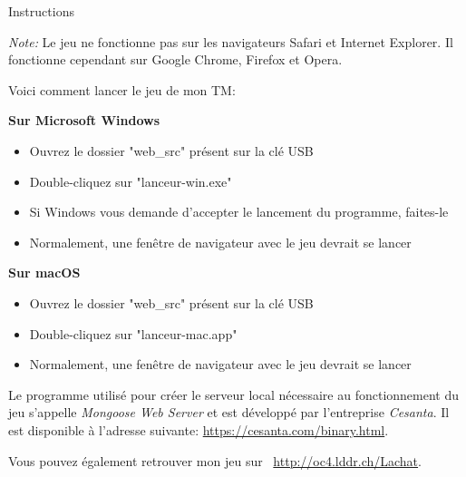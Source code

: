 \documentclass[10pt,a4paper]{article}
\begin{document}

\begin{center}
{\Huge Instructions}
\end{center}

\textit{Note: } Le jeu ne fonctionne pas sur les navigateurs Safari et Internet Explorer. Il fonctionne cependant sur Google Chrome, Firefox et Opera.

\vspace{15pt}

Voici comment lancer le jeu de mon TM:

\vspace{10pt}

\textbf{Sur Microsoft Windows}
\begin{itemize}
\item Ouvrez le dossier "web\_src" présent sur la clé USB
\item Double-cliquez sur "lanceur-win.exe"
\item Si Windows vous demande d'accepter le lancement du programme, faites-le
\item Normalement, une fenêtre de navigateur avec le jeu devrait se lancer
\end{itemize}

\vspace{15pt}

\textbf{Sur macOS}
\begin{itemize}
\item Ouvrez le dossier "web\_src" présent sur la clé USB
\item Double-cliquez sur "lanceur-mac.app"
\item Normalement, une fenêtre de navigateur avec le jeu devrait se lancer
\end{itemize}

\vspace{15pt}

Le programme utilisé pour créer le serveur local nécessaire au fonctionnement du jeu s'appelle \textit{Mongoose Web Server} et est développé par l'entreprise \textit{Cesanta}. Il est disponible à l'adresse suivante: \url{https://cesanta.com/binary.html}.

\vspace{15pt}

Vous pouvez également retrouver mon jeu sur \ \url{http://oc4.lddr.ch/Lachat}.
\end{document}
